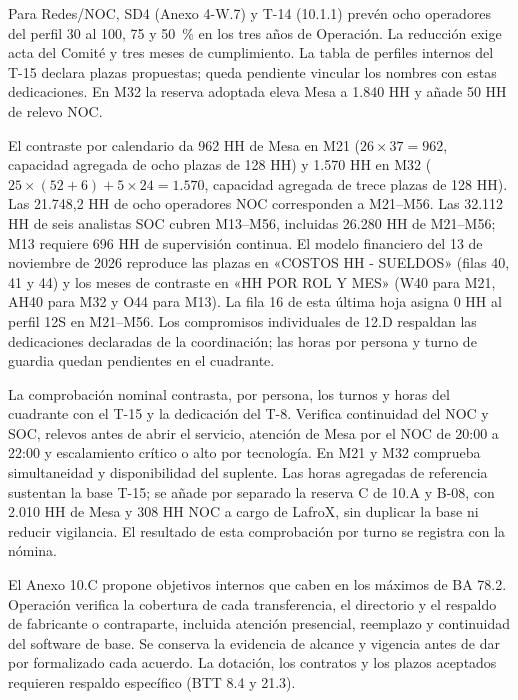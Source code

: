 \begin{description}[style=nextline,leftmargin=0pt,labelwidth=0pt,labelsep=0pt,font=\normalfont\intersemibold]
Para Redes/NOC, SD4 (Anexo 4-W.7) y T-14 (10.1.1) prevén ocho operadores del perfil 30 al 100, 75 y 50~\% en los tres años de Operación. La reducción exige acta del Comité y tres meses de cumplimiento. La tabla de perfiles internos del T-15 declara plazas propuestas; queda pendiente vincular los nombres con estas dedicaciones. En M32 la reserva adoptada eleva Mesa a 1.840 HH y añade 50 HH de relevo NOC.

El contraste por calendario da 962 HH de Mesa en M21 ($26\times37=962$, capacidad agregada de ocho plazas de 128 HH) y 1.570 HH en M32 ($25\times(52+6)+5\times24=1.570$, capacidad agregada de trece plazas de 128 HH). Las 21.748,2 HH de ocho operadores NOC corresponden a M21--M56. Las 32.112 HH de seis analistas SOC cubren M13--M56, incluidas 26.280 HH de M21--M56; M13 requiere 696 HH de supervisión continua. El modelo financiero del 13 de noviembre de 2026 reproduce las plazas en «COSTOS HH - SUELDOS» (filas 40, 41 y 44) y los meses de contraste en «HH POR ROL Y MES» (W40 para M21, AH40 para M32 y O44 para M13). La fila 16 de esta última hoja asigna 0 HH al perfil 12S en M21--M56. Los compromisos individuales de 12.D respaldan las dedicaciones declaradas de la coordinación; las horas por persona y turno de guardia quedan pendientes en el cuadrante.

La comprobación nominal contrasta, por persona, los turnos y horas del cuadrante con el T-15 y la dedicación del T-8. Verifica continuidad del NOC y SOC, relevos antes de abrir el servicio, atención de Mesa por el NOC de 20:00 a 22:00 y escalamiento crítico o alto por tecnología. En M21 y M32 comprueba simultaneidad y disponibilidad del suplente. Las horas agregadas de referencia sustentan la base T-15; se añade por separado la reserva C de 10.A y B-08, con 2.010 HH de Mesa y 308 HH NOC a cargo de LafroX, sin duplicar la base ni reducir vigilancia. El resultado de esta comprobación por turno se registra con la nómina.

\item[B-03. Acuerdos operacionales y contratos de apoyo.]
El Anexo 10.C propone objetivos internos que caben en los máximos de BA 78.2. Operación verifica la cobertura de cada transferencia, el directorio y el respaldo de fabricante o contraparte, incluida atención presencial, reemplazo y continuidad del software de base. Se conserva la evidencia de alcance y vigencia antes de dar por formalizado cada acuerdo. La dotación, los contratos y los plazos aceptados requieren respaldo específico (BTT 8.4 y 21.3).


\end{description}
